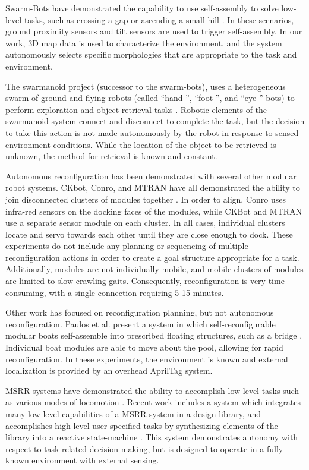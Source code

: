 \documentclass[journal]{IEEEtran}
\begin{document}
Swarm-Bots have demonstrated the capability to use self-assembly to solve low-level tasks, such as crossing a gap \cite{gross2006autonomous} or ascending a small hill \cite{o2010self}.  In these scenarios, ground proximity sensors and tilt sensors are used to trigger self-assembly.  In our work, 3D map data is used to characterize the environment, and the system autonomously selects specific morphologies that are appropriate to the task and environment. 

The swarmanoid project (successor to the swarm-bots), uses a heterogeneous swarm of ground and flying robots (called ``hand-'', ``foot-'', and ``eye-'' bots) to perform exploration and object retrieval tasks  \cite{Dorigo2013}. Robotic elements of the swarmanoid system connect and disconnect to complete the task, but the decision to take this action is not made autonomously by the robot in response to sensed environment conditions. While the location of the object to be retrieved is unknown, the method for retrieval is known and constant.

Autonomous reconfiguration has been demonstrated with several other modular robot systems. CKbot, Conro, and MTRAN have all demonstrated the ability to join disconnected clusters of modules together \cite{Yim2007, Rubenstein2004,Murata2006}. In order to align, Conro uses infra-red sensors on the docking faces of the modules, while CKBot and MTRAN use a separate sensor module on each cluster.  In all cases, individual clusters locate and servo towards each other until they are close enough to dock. These experiments do not include any planning or sequencing of multiple reconfiguration actions in order to create a goal structure appropriate for a task.  Additionally,  modules are not individually mobile, and mobile clusters of modules are limited to slow crawling gaits.  Consequently, reconfiguration is very time consuming, with a single connection requiring 5-15 minutes.

Other work has focused on reconfiguration planning, but not autonomous reconfiguration.  Paulos et al. present a system in which self-reconfigurable modular boats self-assemble into prescribed floating structures, such as a bridge \cite{Paulos2015}.  Individual boat modules are able to move about the pool, allowing for rapid reconfiguration.  In these experiments, the environment is known and external localization is provided by an overhead AprilTag system. 

MSRR systems have demonstrated the ability to accomplish low-level tasks such as various modes of locomotion \cite{Yim1994}.
Recent work includes a system which integrates many low-level capabilities of a MSRR system in a design library, and accomplishes high-level user-specified tasks by synthesizing elements of the library into a reactive state-machine \cite{Jing2016}. This system demonstrates autonomy with respect to task-related decision making, but is designed to operate in a fully known environment with external sensing.
\end{document}
